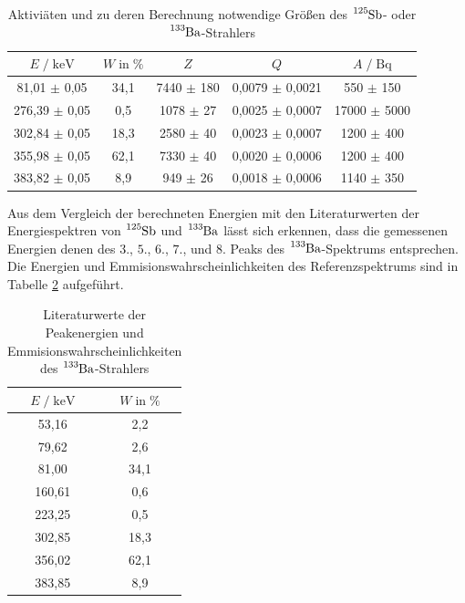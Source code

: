 \begin{table}
  \centering
  \caption{Aktiviäten und zu deren Berechnung notwendige Größen des $\ce{^{125}Sb}$- oder $\ce{^{133}Ba}$-Strahlers}
  \label{tab:mess5}
  \begin{tabular}{c c c c c}
  \toprule
  $E \;/\; \si{\kilo\eV}$ & $W \;\text{in}\; \si{\percent}$ & $Z$ & $Q$ & $A \;/\; \si{\becquerel}$ \\
  \midrule
     81,01 $\pm$ 0,05 & 34,1 & 7440 $\pm$ 180 & 0,0079 $\pm$ 0,0021 &   550 $\pm$  150 \\
    276,39 $\pm$ 0,05 &  0,5 & 1078 $\pm$  27 & 0,0025 $\pm$ 0,0007 & 17000 $\pm$ 5000 \\
    302,84 $\pm$ 0,05 & 18,3 & 2580 $\pm$  40 & 0,0023 $\pm$ 0,0007 &  1200 $\pm$  400 \\
    355,98 $\pm$ 0,05 & 62,1 & 7330 $\pm$  40 & 0,0020 $\pm$ 0,0006 &  1200 $\pm$  400 \\
    383,82 $\pm$ 0,05 &  8,9 &  949 $\pm$  26 & 0,0018 $\pm$ 0,0006 &  1140 $\pm$  350 \\
  \bottomrule
  \end{tabular}
\end{table}

Aus dem Vergleich der berechneten Energien mit den Literaturwerten der Energiespektren von $\ce{^{125}Sb}$ und $\ce{^{133}Ba}$
lässt sich erkennen, dass die gemessenen Energien denen des $3$., $5$., $6$., $7$., und $8$. Peaks des $\ce{^{133}Ba}$-Spektrums
entsprechen. Die Energien und Emmisionswahrscheinlichkeiten des Referenzspektrums sind in Tabelle \ref{tab:mess6} aufgeführt. \\

\begin{table}
  \centering
  \caption{Literaturwerte der Peakenergien und Emmisionswahrscheinlichkeiten des $\ce{^{133}Ba}$-Strahlers}
  \label{tab:mess6}
  \begin{tabular}{c c}
  \toprule
  $E \;/\; \si{\kilo\eV}$ & $W \;\text{in}\; \si{\percent}$ \\
  \midrule
     53,16 &  2,2 \\
     79,62 &  2,6 \\
     81,00 & 34,1 \\
    160,61 &  0,6 \\
    223,25 &  0,5 \\
    302,85 & 18,3 \\
    356,02 & 62,1 \\
    383,85 &  8,9 \\
  \bottomrule
  \end{tabular}
\end{table}

